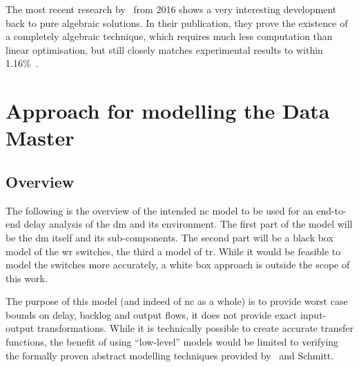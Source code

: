 The most recent research by~\citeauthor{bondorf_delay_2016} from 2016 shows a very interesting development back to pure algebraic solutions. In their publication, they prove the existence of a completely algebraic technique,
which requires much less computation than linear optimisation, but still closely matches experimental results to within 1.16\%~\cite{bondorf_delay_2016}.


\section{Approach for modelling the Data Master}

\subsection{Overview}

The following is the overview of the intended \gls{nc} model to be used for an end-to-end delay analysis of the \gls{dm} and its environment.
The first part of the model will be the \gls{dm} itself and its sub-components. The second part will be a black box model of the \gls{wr} switches, the third a model of \gls{tr}.
While it would be feasible to model the switches more accurately, a white box approach is outside the scope of this work.
\par
The purpose of this model (and indeed of \gls{nc} as a whole) is to provide worst case bounds on delay, backlog and output flows, it does not provide exact input-output transformations.
While it is technically possible to create accurate transfer functions, the benefit of using \enquote{low-level} models would be limited to verifying the formally proven abstract modelling techniques
provided by~\citeauthor{thiran_network_2001} and Schmitt.
%

